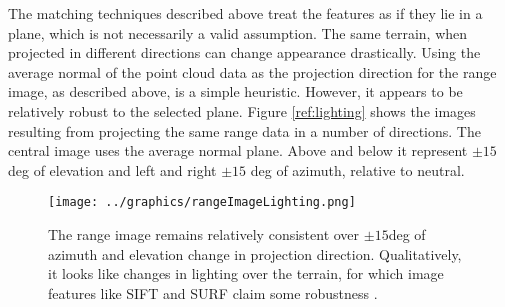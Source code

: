 The matching techniques described above treat the features as if they lie in a plane, which is not necessarily a valid assumption. The same terrain, when projected in different directions can change appearance drastically. Using the average normal of the point cloud data as the projection direction for the range image, as described above, is a simple heuristic. However, it appears to be relatively robust to the selected plane. Figure \ref{ref:lighting} shows the images resulting from projecting the same range data in a number of directions. The central image uses the average normal plane. Above and below it represent $\pm 15$deg of elevation and left and right $\pm 15$ deg of azimuth, relative to neutral.

\begin{figure}[htbp]
   \centering
   \texttt{[image: ../graphics/rangeImageLighting.png]} %
   \caption{The range image remains relatively consistent over $\pm 15$deg of azimuth and elevation change in projection direction. Qualitatively, it looks like changes in lighting over the terrain, for which image features like SIFT and SURF claim some robustness \cite{citationneeded}.}
   \label{fig:lighting}
\end{figure}

